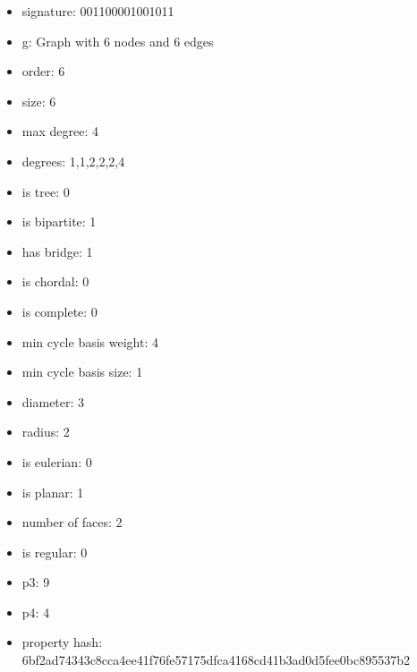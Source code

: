 \begin{itemize}
\item signature: 001100001001011
\item g: Graph with 6 nodes and 6 edges
\item order: 6
\item size: 6
\item max degree: 4
\item degrees: 1,1,2,2,2,4
\item is tree: 0
\item is bipartite: 1
\item has bridge: 1
\item is chordal: 0
\item is complete: 0
\item min cycle basis weight: 4
\item min cycle basis size: 1
\item diameter: 3
\item radius: 2
\item is eulerian: 0
\item is planar: 1
\item number of faces: 2
\item is regular: 0
\item p3: 9
\item p4: 4
\item property hash: 6bf2ad74343c8cca4ee41f76fe57175dfca4168cd41b3ad0d5fee0bc895537b2
\end{itemize}
\newpage
\begin{figure}
\end{figure}
